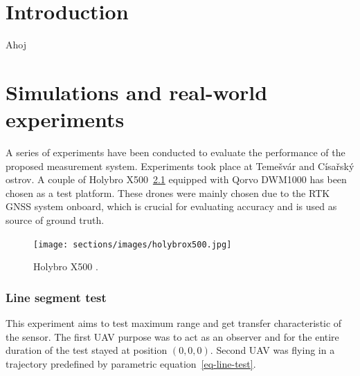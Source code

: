 \documentclass[twoside]{ctustyle/ctuthesis}
\theoremstyle{plain}
\theoremstyle{definition}
\theoremstyle{note}
\begin{document}
\maketitle


\hypertarget{introduction}{%
\chapter{Introduction}\label{introduction}}

Ahoj


\hypertarget{simulations-and-real-world-experiments}{%
\chapter{Simulations and real-world
experiments}\label{simulations-and-real-world-experiments}}

A series of experiments have been conducted to evaluate the performance
of the proposed measurement system. Experiments took place at Temešvár
and Císařský ostrov. A couple of Holybro X500~\ref{fig-holybrox500}
equipped with Qorvo DWM1000 has been chosen as a test platform. These
drones were mainly chosen due to the RTK GNSS system onboard, which is
crucial for evaluating accuracy and is used as source of ground truth.

\begin{figure}

{\centering \texttt{[image: sections/images/holybrox500.jpg]}

}

\caption[\label{fig-holybrox500}Holybro X500 .]{\label{fig-holybrox500}Holybro X500 \footnotemark{}.}

\end{figure}

\hypertarget{line-segment-test}{%
\subsection{Line segment test}\label{line-segment-test}}

This experiment aims to test maximum range and get transfer
characteristic of the sensor. The first UAV purpose was to act as an
observer and for the entire duration of the test stayed at position
\(\left(0, 0, 0\right)\). Second UAV was flying in a trajectory
predefined by parametric equation~\ref{eq-line-test}.
\end{document}
